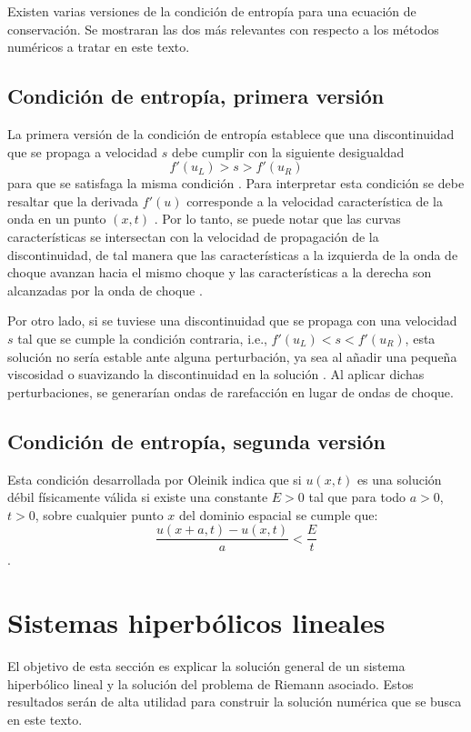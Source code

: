 Existen varias versiones de la condición de entropía para una ecuación de conservación. Se mostraran las dos más relevantes con respecto a los métodos numéricos a tratar en este texto.
\subsection{Condición de entropía, primera versión}
La primera versión de la condición de entropía establece que una discontinuidad que se propaga a velocidad $s$ debe cumplir con la siguiente desigualdad
\begin{equation}
	f'(u_L) > s > f'(u_R)
	\label{eq:entropy}
\end{equation}
para que se satisfaga la misma condición \cite{Leveque}. Para interpretar esta condición se debe resaltar que la derivada $f'(u)$ corresponde a la velocidad característica de la onda en un punto $(x,t)$ \cite{Leveque}. Por lo tanto, se puede notar que las curvas características se intersectan con la velocidad de propagación de la discontinuidad, de tal manera que las características a la izquierda de la onda de choque avanzan hacia el mismo choque y las características a la derecha son alcanzadas por la onda de choque \cite{Leveque}.

Por otro lado, si se tuviese una discontinuidad que se propaga con una velocidad $s$ tal que se cumple la condición contraria, i.e., $f'(u_L) < s < f'(u_R)$, esta solución no sería estable ante alguna perturbación, ya sea al añadir una pequeña viscosidad o suavizando la discontinuidad en la solución \cite{Leveque}. Al aplicar dichas perturbaciones, se generarían ondas de rarefacción en lugar de ondas de choque.

\subsection{Condición de entropía, segunda versión}
Esta condición desarrollada por Oleinik \cite{Leveque} indica que si $u(x,t)$ es una solución débil físicamente válida si existe una constante $E >0$  tal que para todo $a>0$, $t>0$, sobre cualquier punto $x$ del dominio espacial se cumple que:
\begin{equation}
	\frac{u(x+a,t) - u(x,t)}{a} < \frac{E}{t}
\end{equation}
\cite{Leveque}.

\section{Sistemas hiperbólicos lineales}
El objetivo de esta sección es explicar la solución general de un sistema hiperbólico lineal y la solución del problema de Riemann asociado. Estos resultados serán de alta utilidad para construir la solución numérica que se busca en este texto.

